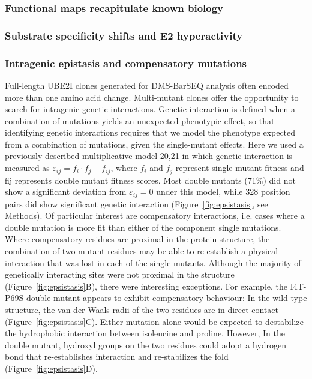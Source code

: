 \subsubsection{Functional maps recapitulate known biology}

\subsubsection{Substrate specificity shifts and E2 hyperactivity}

\subsubsection{Intragenic epistasis and compensatory mutations}

Full-length UBE2I clones generated for DMS-BarSEQ analysis often encoded more than one amino acid change. Multi-mutant clones offer the opportunity to search for intragenic genetic interactions. Genetic interaction is defined when a combination of mutations yields an unexpected phenotypic effect, so that identifying genetic interactions requires that we model the phenotype expected from a combination of mutations, given the single-mutant effects.  Here we used a previously-described multiplicative model 20,21 in which genetic interaction is measured as $\varepsilon_{ij} = f_i \cdot f_j - f_{ij}$, where $f_i$ and $f_j$ represent single mutant fitness and fij represents double mutant fitness scores. Most double mutants (71\%) did not show a significant deviation from $\varepsilon_{ij} = 0$ under this model, while 328 position pairs did show significant genetic interaction (Figure~\ref{fig:epsistasis}, see Methods). Of particular interest are compensatory interactions, i.e. cases where a double mutation is more fit than either of the component single mutations.  Where compensatory residues are proximal in the protein structure, the combination of two mutant residues may be able to re-establish a physical interaction that was lost in each of the single mutants. Although the majority of genetically interacting sites were not proximal in the structure (Figure~\ref{fig:epsistasis}B), there were interesting exceptions. For example, the I4T-P69S double mutant appears to exhibit compensatory behaviour: In the wild type structure, the van-der-Waals radii of the two residues are in direct contact (Figure~\ref{fig:epsistasis}C). Either mutation alone would be expected to destabilize the hydrophobic interaction between isoleucine and proline.  However, In the double mutant, hydroxyl groups on the two residues could adopt a hydrogen bond that re-establishes interaction and re-stabilizes the fold (Figure~\ref{fig:epsistasis}D).

